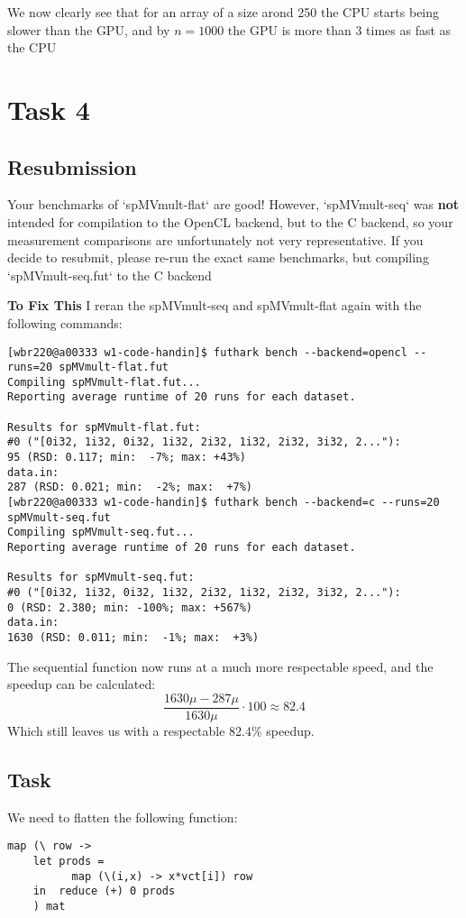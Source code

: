 \documentclass[11pt]{article}
\begin{document}
We now clearly see that for an array of a size arond 250 the CPU starts being slower than
the GPU, and by \(n = 1000\) the GPU is more than 3 times as fast as the CPU

\section{Task 4}
\label{sec:org1241c4f}
\subsection{Resubmission}
\label{sec:org90ac418}
Your benchmarks of `spMVmult-flat` are good! However, `spMVmult-seq` was \textbf{not}
  intended for compilation to the OpenCL backend, but to the C backend, so your
  measurement comparisons are unfortunately not very representative. If you
  decide to resubmit, please re-run the exact same benchmarks, but compiling
  `spMVmult-seq.fut` to the C backend  

\textbf{To Fix This} I reran the spMVmult-seq and spMVmult-flat again with the following commands:
\begin{verbatim}
[wbr220@a00333 w1-code-handin]$ futhark bench --backend=opencl --runs=20 spMVmult-flat.fut
Compiling spMVmult-flat.fut...
Reporting average runtime of 20 runs for each dataset.

Results for spMVmult-flat.fut:
#0 ("[0i32, 1i32, 0i32, 1i32, 2i32, 1i32, 2i32, 3i32, 2..."):         95 (RSD: 0.117; min:  -7%; max: +43%)
data.in:                                                             287 (RSD: 0.021; min:  -2%; max:  +7%)
[wbr220@a00333 w1-code-handin]$ futhark bench --backend=c --runs=20 spMVmult-seq.fut
Compiling spMVmult-seq.fut...
Reporting average runtime of 20 runs for each dataset.

Results for spMVmult-seq.fut:
#0 ("[0i32, 1i32, 0i32, 1i32, 2i32, 1i32, 2i32, 3i32, 2..."):          0 (RSD: 2.380; min: -100%; max: +567%)
data.in:                                                            1630 (RSD: 0.011; min:  -1%; max:  +3%)
\end{verbatim}
The sequential function now runs at a much more respectable speed, and the speedup can be
calculated:
$$ \frac{1630\mu - 287\mu}{1630\mu}\cdot 100 \approx 82.4 $$
Which still leaves us with a respectable 82.4\% speedup.

\subsection{Task}
\label{sec:orgfb233d6}
We need to flatten the following function:
\begin{verbatim}
map (\ row ->                             
	let prods =                       
	      map (\(i,x) -> x*vct[i]) row
	in  reduce (+) 0 prods            
    ) mat                                 
\end{verbatim}
\end{document}
